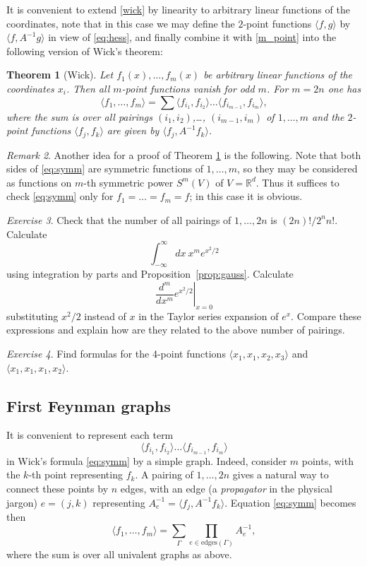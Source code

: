 \documentclass[10pt]{amsart}
\newtheorem{thm}{Theorem}[section]
\theoremstyle{definition}
\theoremstyle{remark}
\newtheorem{rem}[thm]{Remark}
\newtheorem{exs}[thm]{Exercise}
\newcommand{\R}{\mathbb R}
\def\<{\langle}
\def\>{\rangle}
\newcommand{\GG}{\Gamma}
\begin{document}
It is convenient to extend \eqref{wick} by linearity to arbitrary
linear functions of the coordinates, note that in this case we may
define the $2$-point functions $\<f,g\>$ by $\<f,A^{-1}g\>$ in view
of \eqref{eq:hess}, and finally combine it with \eqref{m_point} into
the following version of Wick's theorem:

\begin{thm}[Wick]\label{thm:wick}
Let  $f_1(x),\dots,f_m(x)$ be arbitrary linear functions of the
coordinates $x_i$. Then all $m$-point functions vanish for odd $m$.
For $m=2n$ one has
\begin{equation}
\label{eq:symm}
\<f_1,\dots,f_m\>=\sum \<f_{i_1},f_{i_2}\>\dots\<f_{i_{m-1}},f_{i_m}\>,
\end{equation}
where the sum is over all pairings $(i_1,i_2)$,\dots, $(i_{m-1},i_m)$
of $1,\dots,m$ and the $2$-point functions $\<f_j,f_k\>$ are given by
$\<f_j,A^{-1}f_k\>$.

\end{thm}

\begin{rem}
Another idea for a proof of Theorem \ref{thm:wick} is the following.
Note that both sides of \eqref{eq:symm} are symmetric functions of
$1,\dots,m$, so they  may be considered as functions on $m$-th symmetric
power $S^m(V)$ of $V=\R^d$.
Thus it suffices to check \eqref{eq:symm} only for $f_1=\dots=f_m=f$;
in this case it is obvious.
\end{rem}

\begin{exs}
Check that the number of all pairings of $1,\dots,2n$ is
$(2n)! / 2^n n!$. Calculate
$$
   \int_{-\infty}^\infty dx\ x^m e^{x^2/2}
$$
 using integration by parts and Proposition~\ref{prop:gauss}. Calculate
$$
  \left. \frac{d^m}{d x^m} e^{x^2/2} \right|_{x=0}
$$
substituting $x^2/2$ instead of $x$ in the Taylor series expansion of $e^x$.
Compare these expressions and explain how are they related to the above number of pairings.
\end{exs}

\begin{exs}
Find formulas for the 4-point functions $\<x_1,x_1,x_2,x_3\>$ and
$\<x_1,x_1,x_1,x_2\>$.
\end{exs}

\subsection{First Feynman graphs}
It is convenient to represent each term
$$
   \<f_{i_1},f_{i_2}\>\dots\<f_{i_{m-1}},f_{i_m}\>
$$
in Wick's formula \eqref{eq:symm} by a simple graph. Indeed,
consider $m$ points, with the $k$-th point representing $f_k$.
A pairing of $1,\dots,2n$ gives a natural way to connect these
points by $n$ edges, with an edge (a {\em propagator} in the
physical jargon) $e=(j,k)$ representing
$A^{-1}_e=\<f_j,A^{-1}f_k\>$.
Equation \eqref{eq:symm} becomes then
\begin{equation}\label{m_diagr}
\<f_1,\dots,f_m\>=\sum_{\GG}\prod_{e\in\text{edges}
(\GG)}A^{-1}_e,
\end{equation}
where the sum is over all univalent graphs as above.
\end{document}
